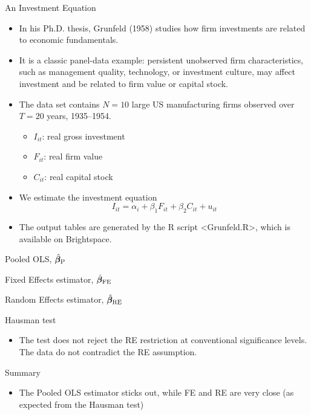 \documentclass[english, professionalfonts,smaller,xcolor=dvipsnames]{beamer}
\def\texttt#1{<#1>}%
\begin{document}
\begin{frame}{An Investment Equation}
\begin{itemize}
\item In his Ph.D. thesis, Grunfeld (1958) studies how firm investments are related to economic fundamentals.
\item It is a classic panel-data example: persistent unobserved firm characteristics, such as management quality, technology, or investment culture, may affect investment and be related to firm value or capital stock.
\item The data set contains $N=10$ large US manufacturing firms observed over $T=20$ years, 1935--1954.
\begin{itemize}
\item $I_{it}$: real gross investment
\item $F_{it}$: real firm value
\item $C_{it}$: real capital stock
\end{itemize}
\item We estimate the investment equation
$$
I_{it} = \alpha_i + \beta_1 F_{it} + \beta_2 C_{it} + u_{it}
$$

\item The output tables are generated by the R script \texttt{Grunfeld.R}, which is available on Brightspace.
\end{itemize}
\end{frame}

\begin{frame}{Pooled OLS, $\hat{\bm \beta}_{\mathrm{P}}$}

\end{frame}

\begin{frame}{Fixed Effects estimator, $\hat{\bm \beta}_{\mathrm{FE}}$}

\end{frame}

\begin{frame}{Random Effects estimator, $\hat{\bm \beta}_{\mathrm{RE}}$}

\end{frame}

\begin{frame}{Hausman test}

\begin{itemize}
\item The test does not reject the RE restriction at conventional significance levels. The data do not contradict the RE assumption.
\end{itemize}
\end{frame}

\begin{frame}{Summary}

\begin{itemize}
\item The Pooled OLS estimator sticks out, while FE and RE are very close (as expected from the Hausman test)
\end{itemize}
\end{frame}
\end{document}
